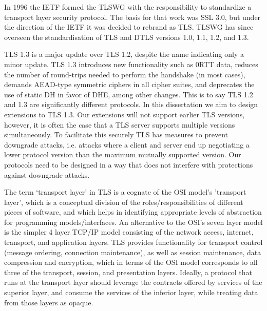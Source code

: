 In 1996 the \ac{IETF} formed the \ac{TLSWG} with
the responsibility to standardize a transport layer security
protocol.
The basis for that work was \ac{SSL} 3.0, but
under the direction of the \ac{IETF} it was decided to rebrand as \ac{TLS}.
\ac{TLSWG} has since overseen the standardisation of
\ac{TLS} and \ac{DTLS} versions 1.0, 1.1, 1.2, and 1.3.

\ac{TLS} 1.3 is a major update over \ac{TLS} 1.2, despite
the name indicating only a minor update.
\ac{TLS} 1.3 introduces new functionality such as 0\ac{RTT} data,
reduces the number of round-trips needed to perform the handshake (in most cases),
demands \ac{AEAD}-type symmetric ciphers in all cipher suites,
and deprecates the use of static \ac{DH} in favor of \ac{DHE},
among other changes.
This is to say \ac{TLS} 1.2 and 1.3 are significantly different protocols.
In this dissertation we aim to design extensions to \ac{TLS} 1.3.
Our extensions will not support earlier \ac{TLS} versions,
however, it is often the case that
a \ac{TLS} server supports multiple versions simultaneously.
To facilitate this securely \ac{TLS} has measures
to prevent downgrade attacks, i.e. attacks where
a client and server end up negotiating a lower protocol
version than the maximum mutually supported version.
Our protocols need to be designed in a way that does
not interfere with protections against downgrade attacks.




The term `transport layer' in \ac{TLS} is a cognate of the \ac{OSI} model's 'transport layer', which is a conceptual division of the roles/responsibilities of different pieces of software, and which helps in identifying appropriate levels of abstraction for programming models/interfaces.
An alternative to the \ac{OSI}'s seven layer model is the simpler 4 layer \ac{TCP}/\ac{IP} model consisting
of the network access, internet, transport, and application layers.
\ac{TLS} provides functionality for transport control (message ordering, connection maintenance),
as well as session maintenance, data compression and encryption,
which in terms of the \ac{OSI} model corresponds to all three of the transport, session, and presentation layers.
Ideally, a protocol that runs at the transport layer should leverage
the contracts offered by services of the superior layer,
and consume the services of the inferior layer,
while treating data from those layers as opaque. %

